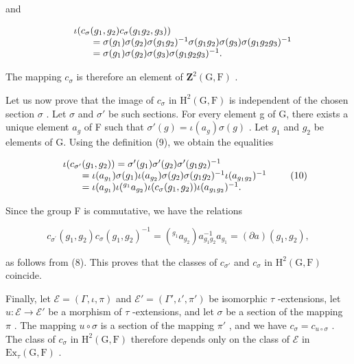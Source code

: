 and

\[
\begin{array}{r l} & {\iota (c _ {\sigma} (g _ {1}, g _ {2}) c _ {\sigma} (g _ {1} g _ {2}, g _ {3}))} \\ & {\qquad = \sigma (g _ {1}) \sigma (g _ {2}) \sigma (g _ {1} g _ {2}) ^ {- 1} \sigma (g _ {1} g _ {2}) \sigma (g _ {3}) \sigma (g _ {1} g _ {2} g _ {3}) ^ {- 1}} \\ & {\qquad = \sigma (g _ {1}) \sigma (g _ {2}) \sigma (g _ {3}) \sigma (g _ {1} g _ {2} g _ {3}) ^ {- 1}.} \end{array}
\]

The mapping \(c_{\sigma}\) is therefore an element of \(\mathbf{Z}^2 (\mathrm{G},\mathrm{F})\) .

Let us now prove that the image of \(c_{\sigma}\) in \(\mathrm{H}^{2}(\mathrm{G},\mathrm{F})\) is independent of the chosen section \(\sigma\) . Let \(\sigma\) and \(\sigma'\) be such sections. For every element g of G, there exists a unique element \(a_{g}\) of F such that \(\sigma'(g) = \iota(a_{g})\sigma(g)\) . Let \(g_{1}\) and \(g_{2}\) be elements of G. Using the definition (9), we obtain the equalities

\[
\begin{array}{r l} & {\iota (c _ {\sigma^ {\prime}} (g _ {1}, g _ {2})) = \sigma^ {\prime} (g _ {1}) \sigma^ {\prime} (g _ {2}) \sigma^ {\prime} (g _ {1} g _ {2}) ^ {- 1}} \\ & {\qquad = \iota (a _ {g _ {1}}) \sigma (g _ {1}) \iota (a _ {g _ {2}}) \sigma (g _ {2}) \sigma (g _ {1} g _ {2}) ^ {- 1} \iota (a _ {g _ {1} g _ {2}}) ^ {- 1}} \\ & {\qquad = \iota (a _ {g _ {1}}) \iota (^ {g _ {1}} a _ {g _ {2}}) \iota (c _ {\sigma} (g _ {1}, g _ {2})) \iota (a _ {g _ {1} g _ {2}}) ^ {- 1}.} \end{array}\tag{10}
\]

Since the group F is commutative, we have the relations

\[
c _ {\sigma^ {\prime}} (g _ {1}, g _ {2}) c _ {\sigma} (g _ {1}, g _ {2}) ^ {- 1} = (^ {g _ {1}} a _ {g _ {2}}) a _ {g _ {1} g _ {2}} ^ {- 1} a _ {g _ {1}} = (\partial a) (g _ {1}, g _ {2}),\tag{11}
\]

as follows from (8). This proves that the classes of \(c_{\sigma'}\) and \(c_{\sigma}\) in \(\mathrm{H}^2(\mathrm{G},\mathrm{F})\) coincide.

Finally, let \(\mathcal{E} = (\Gamma, \iota, \pi)\) and \(\mathcal{E}' = (\Gamma', \iota', \pi')\) be isomorphic \(\tau\) -extensions, let \(u: \mathcal{E} \to \mathcal{E}'\) be a morphism of \(\tau\) -extensions, and let \(\sigma\) be a section of the mapping \(\pi\) . The mapping \(u \circ \sigma\) is a section of the mapping \(\pi'\) , and we have \(c_{\sigma} = c_{u \circ \sigma}\) . The class of \(c_{\sigma}\) in \(\mathrm{H}^2(\mathrm{G}, \mathrm{F})\) therefore depends only on the class of \(\mathcal{E}\) in \(\mathrm{Ex}_{\tau}(\mathrm{G}, \mathrm{F})\) .

